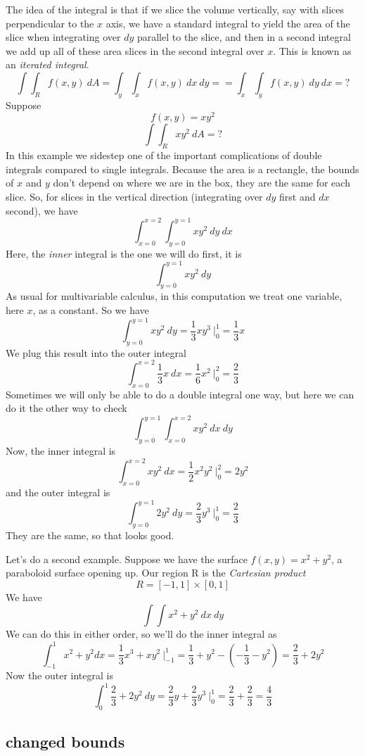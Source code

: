 \documentclass[11pt, oneside]{report}   	%
\begin{document}
The idea of the integral is that if we slice the volume vertically, say with slices perpendicular to the $x$ axis, we have a standard integral to yield the area of the slice when integrating over $dy$ parallel to the slice, and then in a second integral we add up all of these area slices in the second integral over $x$.  This is known as an \emph{iterated integral}.
\[ \int \int_R f(x,y) \ dA = \int_y \int_x f(x,y) \ dx \ dy = = \int_x \int_y f(x,y) \ dy \ dx = ? \]
Suppose
\[ f(x,y) = xy^2 \]
\[ \int \int_R xy^2 \ dA = ? \]
In this example we sidestep one of the important complications of double integrals compared to single integrals.  Because the area is a rectangle, the bounds of $x$ and $y$ don't depend on where we are in the box, they are the same for each slice.  So, for slices in the vertical direction (integrating over $dy$ first and $dx$ second), we have
\[ \int_{x=0}^{x=2} \int_{y=0}^{y=1} xy^2 \ dy \ dx \]
Here, the \emph{inner} integral is the one we will do first, it is
\[ \int_{y=0}^{y=1} xy^2 \ dy \]
As usual for multivariable calculus, in this computation we treat one variable, here $x$, as a constant.  So we have
\[ \int_{y=0}^{y=1} xy^2 \ dy = \frac{1}{3} xy^3 \ \bigg |_0^1 = \frac{1}{3}x \]
We plug this result into the outer integral
\[ \int_{x=0}^{x=2} \frac{1}{3}x  \ dx = \frac{1}{6} x^2 \ \bigg |_0^2 = \frac{2}{3} \]
Sometimes we will only be able to do a double integral one way, but here we can do it the other way to check
\[ \int_{y=0}^{y=1} \int_{x=0}^{x=2} xy^2 \ dx \ dy \]
Now, the inner integral is 
\[ \int_{x=0}^{x=2} xy^2 \ dx = \frac{1}{2} x^2y^2 \ \bigg |_0^2 = 2y^2 \]
and the outer integral is
\[ \int_{y=0}^{y=1} 2y^2 \ dy = \frac{2}{3}y^3 \ \bigg |_0^1 = \frac{2}{3} \]
They are the same, so that looks good.

Let's do a second example.  Suppose we have the surface $f(x,y) = x^2 + y^2$,  a paraboloid surface opening up.  Our region R is the \emph{Cartesian product} 
\[ R = [-1,1] \times [0,1] \]
We have 
\[ \int \int x^2 + y^2 \ dx \ dy \]
We can do this in either order, so we'll do the inner integral as
\[ \int_{-1}^1 x^2 + y^2 dx = \frac{1}{3}x^3 + xy^2 \ \bigg |_{-1}^{1} = \frac{1}{3} + y^2 - (-\frac{1}{3} - y^2) = \frac{2}{3} + 2y^2 \]
Now the outer integral is
\[ \int_0^1 \frac{2}{3} + 2y^2 \ dy = \frac{2}{3}y + \frac{2}{3}y^3  \ \bigg |_{0}^{1} = \frac{2}{3} + \frac{2}{3} = \frac{4}{3} \]

\subsection*{changed bounds}
\end{document}
